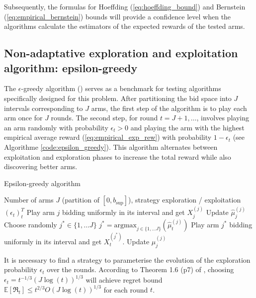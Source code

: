 \documentclass{statsmsc}
\begin{document}
Subsequently, the formulas for Hoeffding (\ref{eq:hoeffding_bound}) and Bernstein (\ref{eq:empirical_bernstein}) bounds will provide a confidence level when the algorithms calculate the estimators of the expected rewards of the tested arms.

\subsection{Non-adaptative exploration and exploitation algorithm: epsilon-greedy}

The $\epsilon$-greedy algorithm (\cite{Sutton1998}) serves as a benchmark for testing algorithms specifically designed for this problem. 
After partitioning the bid space into $J$ intervals corresponding to $J$ arms, the first step of the algorithm is to play each arm once for $J$ rounds. The second step, for round $t = J+1, \dots$, involves playing an arm randomly with probability $\epsilon_t > 0$ and playing the arm with the highest empirical average reward (\ref{eq:empirical_exp_rew}) with probability $1 - \epsilon_t$ (see Algorithme \ref{code:epsilon_greedy}).
This algorithm alternates between exploitation and exploration phases to increase the total reward while also discovering better arms.

\begin{algorithm}[H]
    \caption{Epsilon-greedy algorithm}
    \label{code:epsilon_greedy}
    \begin{algorithmic}[0]
    \Require Number of arms $J$ (partition of $[0, b_{\sup}]$), strategy exploration / exploitation $(\epsilon_t)_t^T$
     
    \State Play arm $j$ bidding uniformly in its interval and get $X_j^{(j)}$
    \State Update $\hat{\mu}^{(j)}_j$
    \EndFor
     
    \State Choose randomly $j^* \in \{1, \dots J\}$
    \Else {}
    \State $j^* = \text{argmax}_{j \in \{1, \dots J\}} (\hat{\mu}^{(j)}_t)$
    \EndIf
    \State Play arm $j^*$ bidding uniformly in its interval and get $X_t^{(j^*)}$.
    \State Update $\hat{\mu}^{(j)}_j$
    \EndFor
  \end{algorithmic}
  \end{algorithm}

It is necessary to find a strategy to parameterise the evolution of the exploration probability $\epsilon_t$ over the rounds. According to Theorem 1.6 (p7) of \cite{slivkins2024introductionmultiarmedbandits}, choosing $\epsilon_t = t^{-1/3} (J \log(t))^{1/3}$ will achieve regret bound $\mathbb{E}\left[\mathfrak{R}_t\right]\leq t^{2/3} O\left(J \log(t)\right)^{1/3}$ for each round $t$. 
\end{document}
